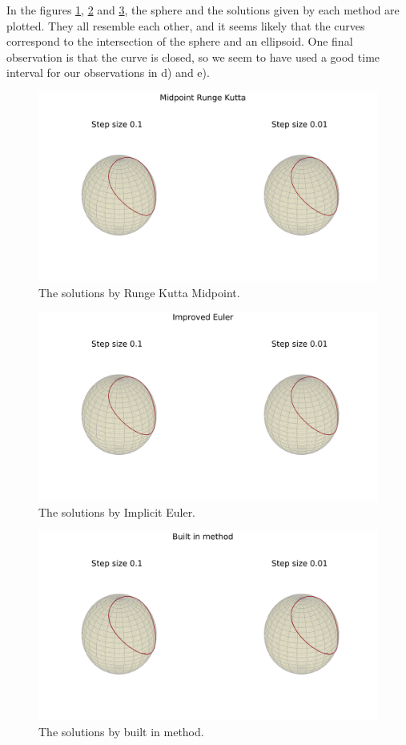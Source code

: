 \documentclass[12pt, a4paper,usenames,dvipsnames]{article}
\begin{document}
In the figures \ref{fig:SphRKMid}, \ref{fig:SphImpEul} and \ref{fig:SphBTin}, the sphere and the solutions given by each method are plotted. They all resemble each other, and it seems likely that the curves correspond to the intersection of the sphere and an ellipsoid. One final observation is that the curve is closed, so we seem to have used a good time interval for our observations in d) and e). 
\pagestyle{plain}
\begin{figure}
    \centering
    \includegraphics[width=\linewidth]{SphRKMid.png}
    \caption{The solutions by Runge Kutta Midpoint.}
    \label{fig:SphRKMid}
\end{figure}
\begin{figure}
    \centering
    \includegraphics[width=\linewidth]{SphIMPEul.png}
    \caption{The solutions by Implicit Euler.}
    \label{fig:SphImpEul}
\end{figure}
\begin{figure}
    \centering
    \includegraphics[width=\linewidth]{SphBTin.png}
    \caption{The solutions by built in method.}
    \label{fig:SphBTin}
\end{figure}
\end{document}
